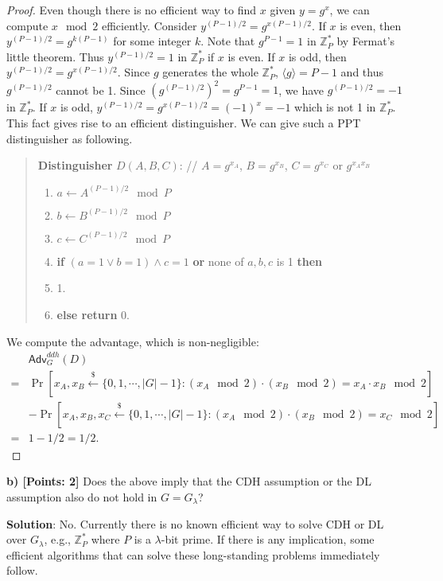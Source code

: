 \documentclass[12pt]{article}
\newcommand{\Z}{\mathbb{Z}}
\newcommand{\getsr}{\stackrel{\$}{\gets}}
\newcommand{\angles}[1]{\langle #1 \rangle}
\newcommand{\Adv}{\textsf{Adv}}
\newcommand{\tab}{\hspace{0.3in}}
\theoremstyle{definition}
\begin{document}
\begin{proof}
Even though there is no efficient way to find $x$ given $y = g^x$, we can compute $x \mod 2$ efficiently. Consider $y^{(P-1)/2} = g^{x(P-1)/2}$. If $x$ is even, then $y^{(P-1)/2} = g^{k(P-1)}$ for some integer $k$. Note that $g^{P-1}=1$ in $\Z_P^*$ by Fermat's little theorem. Thus $y^{(P-1)/2} = 1$ in $\Z_P^*$ if $x$ is even. If $x$ is odd, then $y^{(P-1)/2} = g^{x(P-1)/2}$. Since $g$ generates the whole $\Z_P^*$, $\angles{g} = P-1$ and thus $g^{(P-1)/2}$ cannot be 1. Since $(g^{(P-1)/2})^2 = g^{P-1} = 1$, we have $g^{(P-1)/2} = -1$ in $\Z_P^*$. If $x$ is odd, $y^{(P-1)/2} = g^{x(P-1)/2} = (-1)^x = -1$ which is not 1 in $\Z_P^*$. 
This fact gives rise to an efficient distinguisher. 
We can give such a PPT distinguisher as following.
\begin{quote}
{\bf Distinguisher} $D (A, B, C)$: // $A = g^{x_A}$, $B = g^{x_B}$, $C = g^{x_C}$ or $g^{x_Ax_B}$
\begin{enumerate}
\item $a \gets A^{(P-1)/2} \mod P$
\item $b \gets B^{(P-1)/2} \mod P$
\item $c \gets C^{(P-1)/2} \mod P$
\item {\bf if} $(a=1 \vee b=1) \wedge c=1$ {\bf or} none of $a, b, c$ is 1 {\bf then}
\item \tab {\bf return} 1.
\item {\bf else return} 0.
\end{enumerate}
\end{quote}
We compute the advantage, which is non-negligible:
$$\begin{aligned}
& \Adv_{G}^{ddh}(D) \\
= & \Pr[x_A, x_B \getsr \{0, 1, \cdots, |G|-1\} : (x_A\mod 2)\cdot (x_B \mod 2) = x_A\cdot x_B \mod 2] \\
&- \Pr[x_A, x_B, x_C \getsr \{0, 1, \cdots, |G|-1\} : (x_A\mod 2)\cdot (x_B \mod 2) = x_C \mod 2] \\
=& 1 - 1/2 = 1/2.
\end{aligned}$$
\end{proof}

{\bf b) [Points: 2]} Does the above imply that the CDH assumption or the DL assumption also do not hold in $G = G_\lambda$?

{\bf Solution}: No. Currently there is no known efficient way to solve CDH or DL over $G_\lambda$, e.g., $\Z_P^*$ where $P$ is a $\lambda$-bit prime. If there is any implication, some efficient algorithms that can solve these long-standing problems immediately follow.
\end{document}
